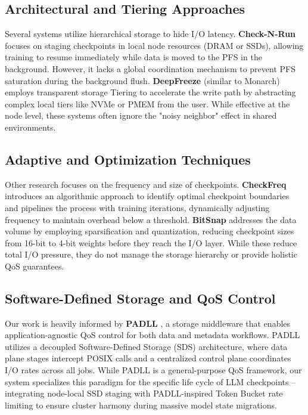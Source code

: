 \documentclass[sigplan,twocolumn,10pt,nonacm]{acmart}
\begin{document}
\subsection{Architectural and Tiering Approaches}
Several systems utilize hierarchical storage to hide I/O latency. \textbf{Check-N-Run} \cite{CheckNRun} focuses on staging checkpoints in local node resources
(DRAM or SSDs), allowing training to resume immediately while data is moved to the PFS in the background. However, it lacks a global coordination
mechanism to prevent PFS saturation during the background flush. \textbf{DeepFreeze} \cite{DeepFreeze} (similar to Monarch) employs transparent storage Tiering to
accelerate the write path by abstracting complex local tiers like NVMe or PMEM from the user. While effective at the node level, these
systems often ignore the "noisy neighbor" effect in shared environments.

\subsection{Adaptive and Optimization Techniques}
Other research focuses on the frequency and size of checkpoints. \textbf{CheckFreq} \cite{CheckFreq} introduces an algorithmic approach to identify optimal checkpoint
boundaries and pipelines the process with training iterations, dynamically adjusting frequency to maintain overhead below a threshold.
\textbf{BitSnap} \cite{BitSnap} addresses the data volume by employing sparsification and quantization, reducing checkpoint sizes from 16-bit to 4-bit weights before
they reach the I/O layer. While these reduce total I/O pressure, they do not manage the storage hierarchy or provide holistic QoS guarantees.

\subsection{Software-Defined Storage and QoS Control}
Our work is heavily informed by \textbf{PADLL} \cite{PADLL}, a storage middleware that enables application-agnostic QoS control for both data and metadata workflows.
PADLL utilizes a decoupled Software-Defined Storage (SDS) architecture, where data plane stages intercept POSIX calls and a centralized
control plane coordinates I/O rates across all jobs. While PADLL is a general-purpose QoS framework, our system specializes this paradigm for
the specific life cycle of LLM checkpoints -- integrating node-local SSD staging with PADLL-inspired Token Bucket rate limiting to ensure cluster harmony
during massive model state migrations.
\end{document}
